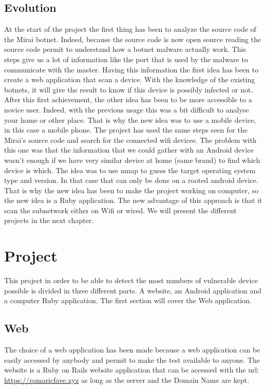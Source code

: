 \documentclass{report}
\begin{document}
\section{Evolution}
At the start of the project the first thing has been to analyze the source code of the Mirai botnet. Indeed, because the source code is now open source reading the source code permit to understand how a botnet malware actually work. This steps give us a lot of information like the port that is used by the malware to communicate with the master.\newline
Having this information the first idea has been to create a web application that scan a device. With the knowledge of the existing botnets, it will give the result to know if this device is possibly infected or not.\newline
After this first achievement, the other idea has been to be more accessible to a novice user. Indeed, with the previous usage this was a bit difficult to analyse your home or other place.\newline
That is why the new idea was to use a mobile device, in this case a mobile phone. The project has used the same steps seen for the Mirai's source code and search for the connected wifi devices.\newline
The problem with this one was that the information that we could gather with an Android device wasn't enough if we have very similar device at home (same brand) to find which device is which. The idea was to use nmap\autocite{nmap} to guess the target operating system type and version. In that case that can only be done on a rooted android device. That is why the new idea has been to make the project working on computer, so the new idea is a Ruby\autocite{ruby} application. The new advantage of this approach is that it scan the subnetwork either on Wifi or wired.\newline
We will present the different projects in the next chapter.

\chapter{Project}
This project in order to be able to detect the most numbers of vulnerable device possible is divided in three different parts. A website, an Android application and a computer Ruby application. The first section will cover the Web application.
\section{Web}
The choice of a web application has been made because a web application can be easily accessed by anybody and permit to make the test available to anyone. The website is a Ruby on Rails website application that can be accessed with the url: \url{https://romaricfave.xyz} as long as the server and the Domain Name are kept.\newline
\end{document}
